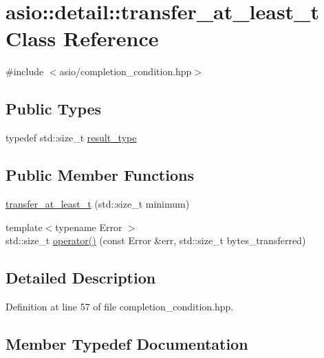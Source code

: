\hypertarget{classasio_1_1detail_1_1transfer__at__least__t}{}\section{asio\+:\+:detail\+:\+:transfer\+\_\+at\+\_\+least\+\_\+t Class Reference}
\label{classasio_1_1detail_1_1transfer__at__least__t}


{\ttfamily \#include $<$asio/completion\+\_\+condition.\+hpp$>$}

\subsection*{Public Types}
\begin{DoxyCompactItemize}
\item 
typedef std\+::size\+\_\+t \hyperlink{classasio_1_1detail_1_1transfer__at__least__t_a5cf3de33becdd273cb313776bea6e5d9}{result\+\_\+type}
\end{DoxyCompactItemize}
\subsection*{Public Member Functions}
\begin{DoxyCompactItemize}
\item 
\hyperlink{classasio_1_1detail_1_1transfer__at__least__t_aa7138468203b5518c8f2853be0d84ed1}{transfer\+\_\+at\+\_\+least\+\_\+t} (std\+::size\+\_\+t minimum)
\item 
{\footnotesize template$<$typename Error $>$ }\\std\+::size\+\_\+t \hyperlink{classasio_1_1detail_1_1transfer__at__least__t_abb2a64a87a9978fcd381aeeb0f77ef9d}{operator()} (const Error \&err, std\+::size\+\_\+t bytes\+\_\+transferred)
\end{DoxyCompactItemize}


\subsection{Detailed Description}


Definition at line 57 of file completion\+\_\+condition.\+hpp.



\subsection{Member Typedef Documentation}
\hypertarget{classasio_1_1detail_1_1transfer__at__least__t_a5cf3de33becdd273cb313776bea6e5d9}{}
